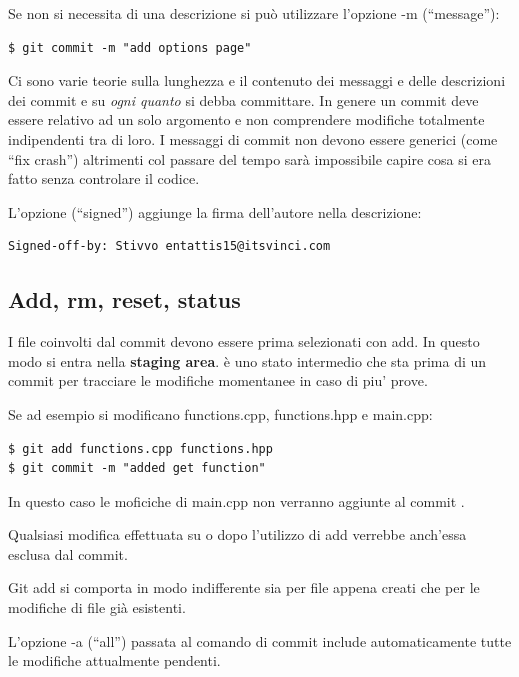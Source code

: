 \documentclass{article} \usepackage[textwidth=19cm,textheight=24cm]{geometry}
\begin{document}
Se non si necessita di una descrizione si può utilizzare l'opzione -m
(``message''):

\begin{verbatim}
$ git commit -m "add options page"
\end{verbatim}

Ci sono varie teorie  sulla lunghezza e il contenuto dei messaggi e delle
descrizioni dei commit e su \textit{ogni quanto} si debba committare. In genere un
commit deve essere relativo ad un solo argomento e non comprendere modifiche
totalmente indipendenti tra di loro. I messaggi di commit non devono essere
generici (come ``fix crash'') altrimenti col passare del tempo sarà impossibile
capire cosa si era fatto senza controlare il codice.

L'opzione  (``signed'') aggiunge la firma dell'autore nella descrizione:

\begin{verbatim}
Signed-off-by: Stivvo entattis15@itsvinci.com
\end{verbatim}

\subsection{Add, rm, reset, status}

I file coinvolti dal commit devono essere prima selezionati con add. In questo
modo si entra nella \textbf{staging area}. è uno stato intermedio che sta prima di
un commit per tracciare le modifiche momentanee in caso di piu' prove.

Se ad esempio si modificano functions.cpp, functions.hpp e main.cpp:

\begin{verbatim}
$ git add functions.cpp functions.hpp
$ git commit -m "added get function"
\end{verbatim}

In questo caso le moficiche di main.cpp non verranno aggiunte al commit .

Qualsiasi modifica effettuata su  o  dopo l'utilizzo
di add verrebbe anch'essa esclusa dal commit.

Git add si comporta in modo indifferente sia per file appena creati che per le
modifiche di file già esistenti.

L'opzione -a (``all'') passata al comando di commit include automaticamente tutte
le modifiche attualmente pendenti.
\end{document}
